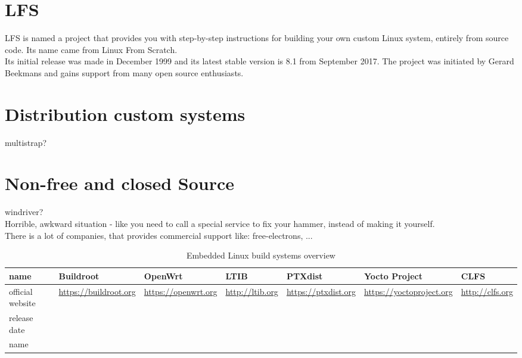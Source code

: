 \documentclass[printmode]{mgr}
\begin{document}
\section{LFS}


LFS is named a project that provides you with step-by-step instructions for building your own custom Linux system, entirely from source code. Its name came from Linux From Scratch.
\\
Its initial release was made in December 1999 and its latest stable version is 8.1 from September 2017. The project was initiated by Gerard Beekmans and gains support from many open source enthusiasts.

\section{Distribution custom systems}

multistrap?

\section{Non-free and closed Source}

windriver? \\
Horrible, awkward situation - like you need to call a special service to fix your hammer, instead of making it yourself. \\
There is a lot of companies, that provides commercial support like: free-electrons, ...


\begin{landscape}

\begin{table}
  \begin{tabular}{| p{3cm} | p{3cm} | p{3cm} | p{3cm} | p{3cm} | p{3cm} | p{3cm} |}
    \hline
    name & Buildroot & OpenWrt & LTIB & PTXdist & Yocto Project & CLFS \\
    \hline
    official website & \url{https://buildroot.org} & \url{https://openwrt.org} & \url{http://ltib.org} & \url{https://ptxdist.org} & \url{https://yoctoproject.org} & \url{http://clfs.org}\\
    \hline
    release date &  &  &  &  &  & \\
    \hline
    name &  &  &  &  &  & \\
    \hline
  \end{tabular}
  \caption{Embedded Linux build systems overview}
\end{table}

\end{landscape}
\end{document}
